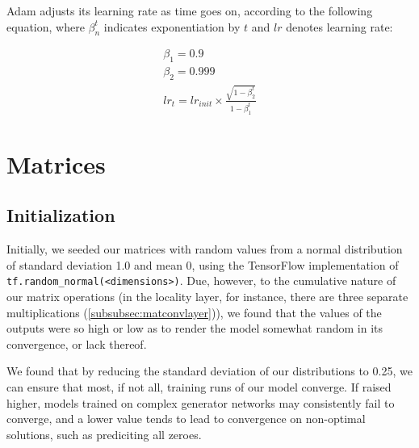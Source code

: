 Adam adjusts its learning rate as time goes on, according to the following 
equation, where $\beta_n^t$ indicates exponentiation by $t$ and $lr$ denotes 
learning rate:
\begin{figure}[h]
	\begin{minipage}[b]{.38\textwidth}
		\centering
		\begin{gather}
			\nonumber
			\beta_1 = 0.9\\
			\nonumber
			\beta_2 = 0.999\\
			\nonumber
			lr_t = lr_{init} \times \frac{\sqrt{1-\beta_2^t}}{1-\beta_1^t}
		\end{gather}
	\end{minipage}
	\hfill
	\begin{minipage}{.6\textwidth}
		\centering
	\end{minipage}
\end{figure}


\section{Matrices}
\subsection{Initialization}
Initially, we seeded our matrices with random values from a normal distribution 
of standard deviation 1.0 and mean 0, using the TensorFlow implementation of 
\texttt{tf.random\_normal(<dimensions>)}. Due, however, to the cumulative nature 
of our matrix operations (in the locality layer, for instance, there are three 
separate multiplications (\ref{subsubsec:matconvlayer})), we found that the 
values of the outputs were so high or low as to render the model somewhat random 
in its convergence, or lack thereof.

We found that by reducing the standard deviation of our distributions to 0.25, 
we can ensure that most, if not all, training runs of our model converge. If 
raised higher, models trained on complex generator networks may consistently 
fail to converge, and a lower value tends to lead to convergence on non-optimal 
solutions, such as prediciting all zeroes. 

